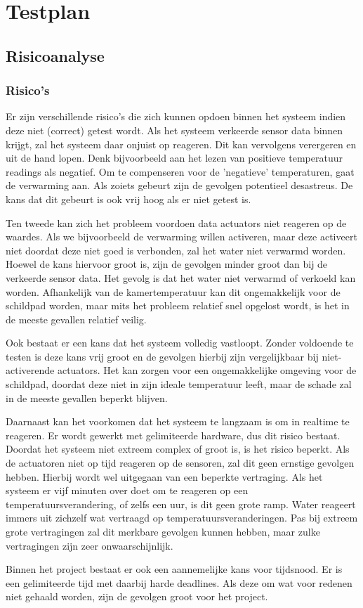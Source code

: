 \documentclass[a4paper]{report}
\begin{document}
\chapter{Testplan}
\section{Risicoanalyse}
\subsection{Risico's}
Er zijn verschillende risico's die zich kunnen opdoen binnen het systeem indien deze niet (correct) getest wordt.
Als het systeem verkeerde sensor data binnen krijgt, zal het systeem daar onjuist op reageren. Dit kan vervolgens verergeren en uit de hand lopen. 
Denk bijvoorbeeld aan het lezen van positieve temperatuur readings als negatief. Om te compenseren voor de 'negatieve' temperaturen, gaat de verwarming aan.
Als zoiets gebeurt zijn de gevolgen potentieel desastreus. De kans dat dit gebeurt is ook vrij hoog als er niet getest is.
\par \smallskip 
Ten tweede kan zich het probleem voordoen data actuators niet reageren op de waardes. 
Als we bijvoorbeeld de verwarming willen activeren, maar deze activeert niet doordat deze niet goed is verbonden, zal het water niet verwarmd worden.
Hoewel de kans hiervoor groot is, zijn de gevolgen minder groot dan bij de verkeerde sensor data. Het gevolg is dat het water niet verwarmd of verkoeld kan worden. 
Afhankelijk van de kamertemperatuur kan dit ongemakkelijk voor de schildpad worden, maar mits het probleem relatief snel opgelost wordt, is het in de meeste gevallen relatief veilig. 
\par \smallskip 
Ook bestaat er een kans dat het systeem volledig vastloopt. Zonder voldoende te testen is deze kans vrij groot en de gevolgen hierbij zijn vergelijkbaar bij niet-activerende actuators. 
Het kan zorgen voor een ongemakkelijke omgeving voor de schildpad, doordat deze niet in zijn ideale temperatuur leeft, maar de schade zal in de meeste gevallen beperkt blijven.
\par \smallskip
Daarnaast kan het voorkomen dat het systeem te langzaam is om in realtime te reageren. Er wordt gewerkt met gelimiteerde hardware, dus dit risico bestaat. 
Doordat het systeem niet extreem complex of groot is, is het risico beperkt. Als de actuatoren niet op tijd reageren op de sensoren, zal dit geen ernstige gevolgen hebben. 
Hierbij wordt wel uitgegaan van een beperkte vertraging. Als het systeem er vijf minuten over doet om te reageren op een temperatuursverandering, of zelfs een uur, is dit geen grote ramp.
Water reageert immers uit zichzelf wat vertraagd op temperatuursveranderingen. Pas bij extreem grote vertragingen zal dit merkbare gevolgen kunnen hebben, maar zulke vertragingen zijn zeer onwaarschijnlijk.
\par \smallskip 
Binnen het project bestaat er ook een aannemelijke kans voor tijdsnood. Er is een gelimiteerde tijd met daarbij harde deadlines. 
Als deze om wat voor redenen niet gehaald worden, zijn de gevolgen groot voor het project. 
\end{document}
